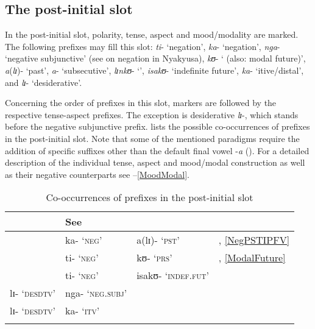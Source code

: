 \subsection{The post-initial slot}
In the post-initial slot, polarity, tense, aspect and mood/modality are marked. The following prefixes may fill this slot: \textit{ti}- \lq negation', \textit{ka}- \lq negation', \textit{nga}- \lq negative subjunctive' (see  on negation in Nyakyusa), \textit{kʊ}- \lq {} (also: modal future)', \textit{a}(\textit{lɪ})- \lq past', \textit{a}- \lq subsecutive', \textit{lɪnkʊ}- \lq {}', \textit{isakʊ}- \lq indefinite future', \textit{ka}- \lq itive/distal', and \textit{lɪ}- \lq desiderative'. 

Concerning the order of prefixes in this slot,  markers are followed by the respective tense-aspect prefixes. The exception is desiderative \textit{lɪ}-, which stands before the negative subjunctive prefix.  lists the possible co-occurrences of prefixes in the post-initial slot. Note that some of the mentioned paradigms require the addition of specific suffixes other than the default final vowel -\textit{a} (). For a detailed description of the individual tense, aspect and mood/modal construction as well as their negative counterparts see --\ref{MoodModal}.


\begin{table}[H]
	\begin{center}
		\begin{tabular}{llll}
			\lsptoprule
			\multicolumn{3}{l}{\footnotesize{Prefixes}} & \footnotesize{See}\\
			\midrule
			& ka- \lq\textsc{neg}' & a(lɪ)- \lq\textsc{pst}' & \sectref{NEGPstPFV}, \ref{NegPSTIPFV}\\
			& ti- \lq\textsc{neg}' & kʊ- \lq\textsc{prs}' & \sectref{Present}, \ref{ModalFuture}\\
			& ti- \lq\textsc{neg}' & isakʊ- \lq\textsc{indef.fut}' & \sectref{isaFut}\\
			lɪ- \lq\textsc{desdtv}' & nga- \lq\textsc{neg.subj}' && \sectref{NegativeSubjunctive}\\
			lɪ- \lq\textsc{desdtv}' & ka- \lq \textsc{itv}' && \sectref{Desiderative}\\
			\lspbottomrule  
		\end{tabular}
		\caption{Co-occurrences of prefixes in the post-initial slot}\label{TablePostInitialPrefix}
	
	\end{center}
\end{table}


